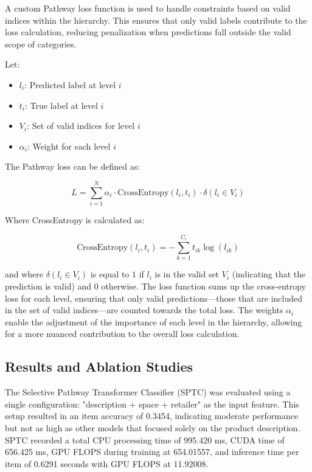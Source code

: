\documentclass[9pt,a4paper,twoside]{rho-class/rho}
\begin{document}
        A custom Pathway loss function is used to handle constraints based on valid indices within the hierarchy. This ensures that only valid labels contribute to the loss calculation, reducing penalization when predictions fall outside the valid scope of categories.
        
        Let:
        \begin{itemize}
        \item \( l_i \): Predicted label at level \( i \)
        \item \( t_i \): True label at level \( i \)
        \item \( V_i \): Set of valid indices for level \( i \)
        \item \( \alpha_i \): Weight for each level \( i \)
    \end{itemize}
        
        The Pathway loss can be defined as:
        
        \[
        L = \sum_{i=1}^{N} \alpha_i \cdot \text{CrossEntropy}(l_i, t_i) \cdot \delta(l_i \in V_i)
        \]
        
        Where CrossEntropy is calculated as:
          
        \[
        \text{CrossEntropy}(l_i, t_i) = -\sum_{k=1}^{C_i} t_{ik} \log(l_{ik})
        \]
        
        and where \(\delta(l_i \in V_i)\) is equal to \(1\) if \(l_i\) is in the valid set \(V_i\) (indicating that the prediction is valid) and \(0\) otherwise. The loss function sums up the cross-entropy loss for each level, ensuring that only valid predictions—those that are included in the set of valid indices—are counted towards the total loss. The weights \(\alpha_i\) enable the adjustment of the importance of each level in the hierarchy, allowing for a more nuanced contribution to the overall loss calculation.

     \subsection{Results and Ablation Studies}
    
        The Selective Pathway Transformer Classifier (SPTC) was evaluated using a single configuration: "description + space + retailer" as the input feature. This setup resulted in an item accuracy of 0.3454, indicating moderate performance but not as high as other models that focused solely on the product description. SPTC recorded a total CPU processing time of 995.420 ms, CUDA time of 656.425 ms, GPU FLOPS during training at 654.01557, and inference time per item of 0.6291 seconds with GPU FLOPS at 11.92008.
\end{document}
